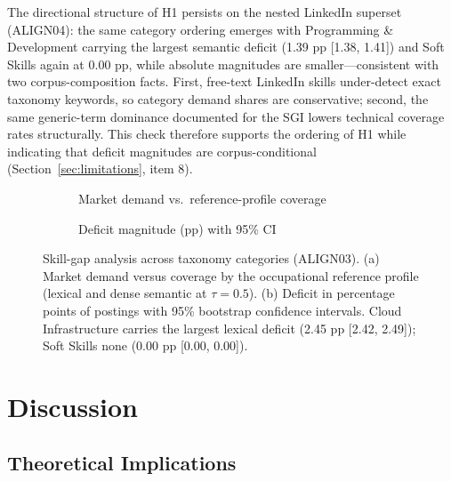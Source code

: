\documentclass[journal]{IEEEtran}
\begin{document}
The directional structure of H1 persists on the nested LinkedIn superset (ALIGN04): the same category ordering emerges with Programming \& Development carrying the largest semantic deficit (1.39 pp [1.38, 1.41]) and Soft Skills again at $0.00$ pp, while absolute magnitudes are smaller---consistent with two corpus-composition facts. First, free-text LinkedIn skills under-detect exact taxonomy keywords, so category demand shares are conservative; second, the same generic-term dominance documented for the SGI lowers technical coverage rates structurally. This check therefore supports the ordering of H1 while indicating that deficit magnitudes are corpus-conditional (Section~\ref{sec:limitations}, item 8).

\begin{figure}[!htbp]
    \centering
    \begin{subfigure}[t]{0.48\textwidth}
        \centering
        \FigGapDemand
        \caption{Market demand vs.\ reference-profile coverage}
        \label{fig:skill_gap_a}
    \end{subfigure}
    \hfill
    \begin{subfigure}[t]{0.48\textwidth}
        \centering
        \FigGapDeficit
        \caption{Deficit magnitude (pp) with 95\% CI}
        \label{fig:skill_gap_b}
    \end{subfigure}
    \caption{Skill-gap analysis across taxonomy categories (ALIGN03). (a) Market demand versus coverage by the occupational reference profile (lexical and dense semantic at $\tau = 0.5$). (b) Deficit in percentage points of postings with 95\% bootstrap confidence intervals. Cloud Infrastructure carries the largest lexical deficit (2.45 pp [2.42, 2.49]); Soft Skills none (0.00 pp [0.00, 0.00]).}
    \label{fig:skill_gap}
\end{figure}

\section{Discussion}
\label{sec:discussion}

\subsection{Theoretical Implications}
\end{document}
